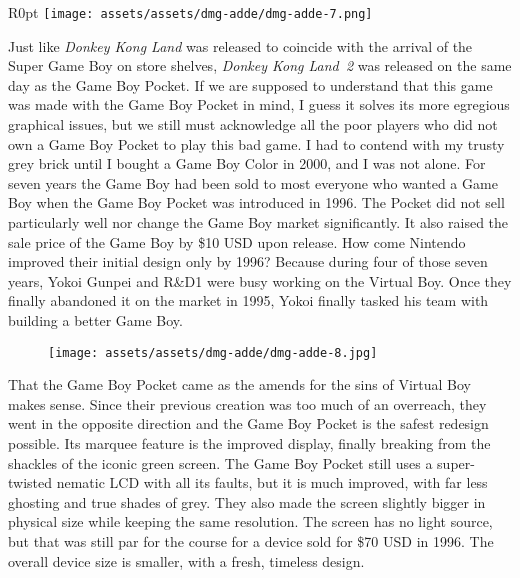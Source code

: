 \documentclass{book}
\begin{document}
\begin{wrapfigure}{R}{0pt} \texttt{[image: assets/assets/dmg-adde/dmg-adde-7.png]}\end{wrapfigure}
Just like \emph{Donkey Kong Land} was released to coincide with the arrival of the Super Game Boy on store shelves, \emph{Donkey Kong Land 2} was released on the same day as the Game Boy Pocket. If we are supposed to understand that this game was made with the Game Boy Pocket in mind, I guess it solves its more egregious graphical issues, but we still must acknowledge all the poor players who did not own a Game Boy Pocket to play this bad game. I had to contend with my trusty grey brick until I bought a Game Boy Color in 2000, and I was not alone. For seven years the Game Boy had been sold to most everyone who wanted a Game Boy when the Game Boy Pocket was introduced in 1996. The Pocket did not sell particularly well nor change the Game Boy market significantly. It also raised the sale price of the Game Boy by \$10 USD upon release. How come Nintendo improved their initial design only by 1996? Because during four of those seven years, Yokoi Gunpei and R\&D1 were busy working on the Virtual Boy. Once they finally abandoned it on the market in 1995, Yokoi finally tasked his team with building a better Game Boy.

\begin{figure}[hbt]
\vskip 10pt
\centering \texttt{[image: assets/assets/dmg-adde/dmg-adde-8.jpg]}
\vskip 6pt
\end{figure}
That the Game Boy Pocket came as the amends for the sins of Virtual Boy makes sense. Since their previous creation was too much of an overreach, they went in the opposite direction and the Game Boy Pocket is the safest redesign possible. Its marquee feature is the improved display, finally breaking from the shackles of the iconic green screen. The Game Boy Pocket still uses a super-twisted nematic LCD with all its faults, but it is much improved, with far less ghosting and true shades of grey. They also made the screen slightly bigger in physical size while keeping the same resolution. The screen has no light source, but that was still par for the course for a device sold for \$70 USD in 1996. The overall device size is smaller, with a fresh, timeless design.
\end{document}
